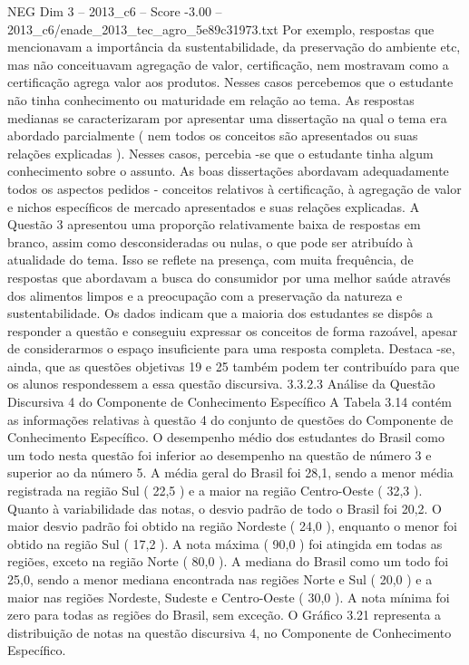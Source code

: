 \begin{textsample}{NEG Dim 3 – 2013\_c6 – Score -3.00 – 2013\_c6/enade\_2013\_tec\_agro\_5e89c31973.txt}
Por exemplo, respostas que mencionavam a importância da sustentabilidade, da preservação do ambiente etc, mas não conceituavam agregação de valor, certificação, nem mostravam como a certificação agrega valor aos produtos.
Nesses casos percebemos que o estudante não tinha conhecimento ou maturidade em relação ao tema.
As respostas medianas se caracterizaram por apresentar uma dissertação na qual o tema era abordado parcialmente ( nem todos os conceitos são apresentados ou suas relações explicadas ).
Nesses casos, percebia -se que o estudante tinha algum conhecimento sobre o assunto.
As boas dissertações abordavam adequadamente todos os aspectos pedidos - conceitos relativos à certificação, à agregação de valor e nichos específicos de mercado apresentados e suas relações explicadas.
A Questão 3 apresentou uma proporção relativamente baixa de respostas em branco, assim como desconsideradas ou nulas, o que pode ser atribuído à atualidade do tema.
Isso se reflete na presença, com muita frequência, de respostas que abordavam a busca do consumidor por uma melhor saúde através dos alimentos limpos e a preocupação com a preservação da natureza e sustentabilidade.
Os dados indicam que a maioria dos estudantes se dispôs a responder a questão e conseguiu expressar os conceitos de forma razoável, apesar de considerarmos o espaço insuficiente para uma resposta completa.
Destaca -se, ainda, que as questões objetivas 19 e 25 também podem ter contribuído para que os alunos respondessem a essa questão discursiva. 3.3.2.3 Análise da Questão Discursiva 4 do Componente de Conhecimento Específico A Tabela 3.14 contém as informações relativas à questão 4 do conjunto de questões do Componente de Conhecimento Específico.
O desempenho médio dos estudantes do Brasil como um todo nesta questão foi inferior ao desempenho na questão de número 3 e superior ao da número 5.
A média geral do Brasil foi 28,1, sendo a menor média registrada na região Sul ( 22,5 ) e a maior na região Centro-Oeste ( 32,3 ).
Quanto à variabilidade das notas, o desvio padrão de todo o Brasil foi 20,2.
O maior desvio padrão foi obtido na região Nordeste ( 24,0 ), enquanto o menor foi obtido na região Sul ( 17,2 ).
A nota máxima ( 90,0 ) foi atingida em todas as regiões, exceto na região Norte ( 80,0 ).
A mediana do Brasil como um todo foi 25,0, sendo a menor mediana encontrada nas regiões Norte e Sul ( 20,0 ) e a maior nas regiões Nordeste, Sudeste e Centro-Oeste ( 30,0 ).
A nota mínima foi zero para todas as regiões do Brasil, sem exceção.
O Gráfico 3.21 representa a distribuição de notas na questão discursiva 4, no Componente de Conhecimento Específico.

\end{textsample}
